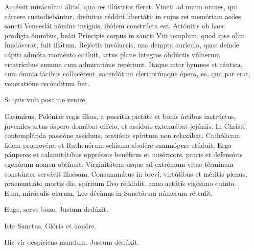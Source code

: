 
Accéssit miráculum áliud, quo res illústrior fíeret.
Vincti ad unum omnes, qui cárcere custodiebántur,
divínitus rédditi libertáti: in cujus rei memóriam aedes,
sancti Venceslái nómine insígnis, ibídem constrúcta est.
Attónitis ob haec prodígia ómnibus, beáti Príncipis corpus
in sancti Viti templum, quod ipse olim fundáverat,
fuit illátum. Rejéctis invólucris, una dempta aurícula,
quae deínde cápiti admóta moménto coáluit,
artus plane íntegros obdúctis vúlnerum cicatrícibus
summa cum admiratióne repériunt.
Itaque inter hymnos et cántica, cum ómnia fácibus collucérent,
sacerdótum clericorúmque ópera, ea, qua par erat,
veneratióne recónditum fuit.

Si quis vult post me venire,



Casimírus, Polóniae regis fílius, a puerítia pietáte et bonis ártibus
instrúctus, juveníles artus áspero domábat cilício,
et assíduis extenuábat jejúniis.
In Christi contemplánda passióne assíduus,
oratiónis spíritum non relaxábat,
Cathólicam fidem promovére,
et Ruthenórum schisma abolére summópere stúduit.
Erga páuperes et calamitátibus oppréssos benéficus et miséricors,
patris et defensóris egenórum nomen obtínuit.
Virginitátem usque ad extrémum vitae términum constánter servávit
illaésam.
Consummátus in brevi, virtútibus et méritis plenus,
praenuntiáto mortis die, spíritum Deo réddidit,
anno aetátis vigésimo quinto.
Eum, miráculis clarum, Leo décimus in Sanctórum númerum réttulit.

\parsTeDeum

Euge, serve bone.
Justum dedúxit.

Iste Sanctus.
Glória et honóre.

Hic vir despíciens mundum.
Justum dedúxit.
